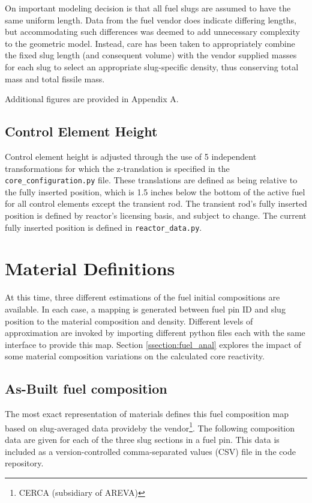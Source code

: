 \documentclass{UWNR_modeling}
\begin{document}
On important modeling decision is that all fuel slugs are assumed to have the
same uniform length.  Data from the fuel vendor does indicate differing
lengths, but accommodating such differences was deemed to add unnecessary
complexity to the geometric model.  Instead, care has been taken to
appropriately combine the fixed slug length (and consequent volume) with the
vendor supplied masses for each slug to select an appropriate slug-specific
density, thus conserving total mass and total fissile mass.

Additional figures are provided in Appendix A.

\subsection{Control Element Height}

Control element height is adjusted through the use of 5 independent
transformations for which the z-translation is specified in the
\texttt{core\_configuration.py} file.  These translations are defined as being
relative to the fully inserted position, which is 1.5 inches below the bottom
of the active fuel for all control elements except the transient rod.  The
transient rod's fully inserted position is defined by reactor's licensing
basis, and subject to change.  The current fully inserted position is defined
in \texttt{reactor\_data.py}.

\section{Material Definitions}\label{section:materials}

At this time, three different estimations of the fuel initial compositions are available.  In each case, a mapping is generated between fuel pin ID and slug position to the material composition and density.  Different levels of approximation are invoked by importing different python files each with the same interface to provide this map.  Section \ref{ssection:fuel_anal} explores the impact of some material composition variations on the calculated core reactivity.

\subsection{As-Built fuel composition}

The most exact representation of materials defines this fuel composition map based on slug-averaged data provideby the vendor\footnote{CERCA (subsidiary of AREVA)}. The following composition data are given for each of the three slug sections in a fuel pin.  This data is included as a version-controlled comma-separated values (CSV) file in the code repository.
\end{document}
